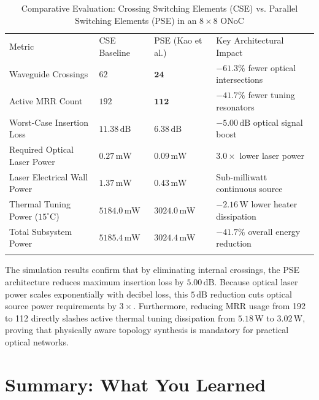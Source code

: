 \begin{table}[htbp]
\centering
\caption{Comparative Evaluation: Crossing Switching Elements (CSE) vs. Parallel Switching Elements (PSE) in an $8 \times 8$ ONoC}
\label{tab:onoc-results}
\begin{tabular}{p{3.2cm}p{2.2cm}p{2.6cm}p{3.4cm}}
\hline\noalign{\smallskip}
Metric & CSE Baseline & PSE (Kao et al.) & Key Architectural Impact \\
\noalign{\smallskip}\svhline\noalign{\smallskip}
Waveguide Crossings & $62$ & $\mathbf{24}$ & $\mathbf{-61.3\%}$ fewer optical intersections \\
Active MRR Count & $192$ & $\mathbf{112}$ & $\mathbf{-41.7\%}$ fewer tuning resonators \\
Worst-Case Insertion Loss & $11.38\,\mathrm{dB}$ & $\mathbf{6.38\,\mathrm{dB}}$ & $\mathbf{-5.00\,\mathrm{dB}}$ optical signal boost \\
Required Optical Laser Power & $0.27\,\mathrm{mW}$ & $\mathbf{0.09\,\mathrm{mW}}$ & $\mathbf{3.0\times}$ lower laser power \\
Laser Electrical Wall Power & $1.37\,\mathrm{mW}$ & $\mathbf{0.43\,\mathrm{mW}}$ & Sub-milliwatt continuous source \\
Thermal Tuning Power ($15^\circ\mathrm{C}$) & $5184.0\,\mathrm{mW}$ & $\mathbf{3024.0\,\mathrm{mW}}$ & $\mathbf{-2.16\,\mathrm{W}}$ lower heater dissipation \\
Total Subsystem Power & $5185.4\,\mathrm{mW}$ & $\mathbf{3024.4\,\mathrm{mW}}$ & $\mathbf{-41.7\%}$ overall energy reduction \\
\noalign{\smallskip}\hline\noalign{\smallskip}
\end{tabular}
\end{table}

The simulation results confirm that by eliminating internal crossings, the PSE architecture reduces maximum insertion loss by $5.00\,\mathrm{dB}$. Because optical laser power scales exponentially with decibel loss, this $5\,\mathrm{dB}$ reduction cuts optical source power requirements by $3\times$. Furthermore, reducing MRR usage from 192 to 112 directly slashes active thermal tuning dissipation from $5.18\,\mathrm{W}$ to $3.02\,\mathrm{W}$, proving that physically aware topology synthesis is mandatory for practical optical networks.

\section{Summary: What You Learned}
\label{sec:ch10_summary}

